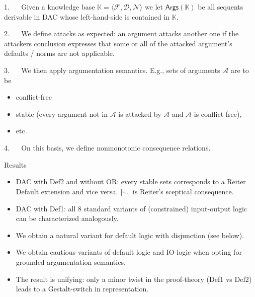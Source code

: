 \documentclass[aspectratio=169]{beamer}
\begin{document}
\begin{frame}[label={sec:org9d76563}]{}
1. ~~ Given a knowledge base \(\mathbb{K} = \langle \mathcal{F}, \mathcal{D}, \mathcal{N} \rangle\) we let \alert{\(\mathsf{Args}(\mathbb{K})\)} be all sequents derivable in DAC whose left-hand-side is contained in \(\mathbb{K}\).
\pause

2. ~~ We define \alert{attacks} as expected: an argument attacks another one if the attackers conclusion expresses that some or all of the attacked argument's defaults / norms are not applicable.
\pause

3. ~~ We then apply \alert{argumentation semantics}. E.g., sets of arguments \(\mathcal{A}\) are to be
\begin{itemize}
\item conflict-free
\item stable (every argument not in \(\mathcal{A}\) is attacked by \(\mathcal{A}\) and \(\mathcal{A}\) is conflict-free),
\item etc.
\end{itemize}
\pause

4. ~~ On this basis, we define nonmonotonic \alert{consequence relations}.

\end{frame}

\begin{frame}[label={sec:org09f854e}]{Results}
\begin{itemize}
\item DAC with Def2 and without OR: every stable sets corresponds to a \alert{Reiter Default} extension and vice versa. \(\mathop{\mid\!\sim}_1\) is Reiter's sceptical consequence. \pause
\item DAC with Def1: all 8 standard variants of (constrained) \alert{input-output logic} can be characterized analogously. \pause
\item We obtain a natural variant for \alert{default logic} with disjunction (see below). \pause
\item We obtain \alert{cautious variants} of default logic and IO-logic when opting for grounded argumentation semantics. \pause
\item The result is \alert{unifying}: only a minor twist in the proof-theory (Def1 vs Def2) leads to a Gestalt-switch in representation.
\end{itemize}
\end{frame}
\end{document}
